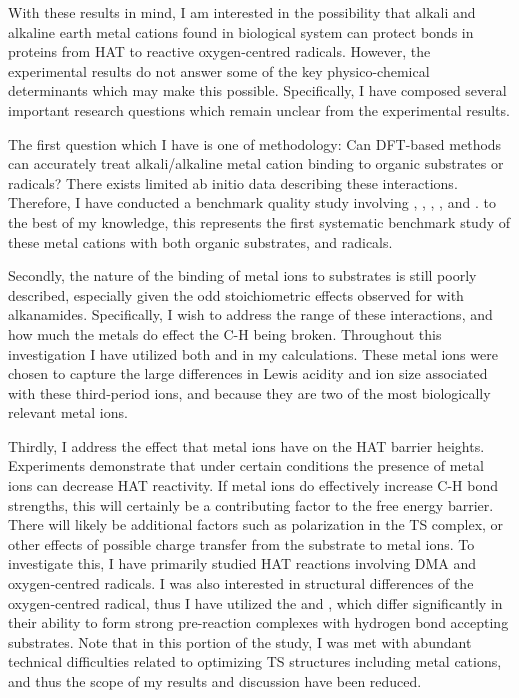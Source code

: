 With these results in mind, I am interested in the possibility that alkali and alkaline earth metal cations found in biological system can protect  bonds in proteins from HAT to reactive oxygen-centred radicals. However, the experimental results do not answer some of the key physico-chemical determinants which may make this possible. Specifically, I have composed several important research questions which remain unclear from the experimental results.

The first question which I have is one of methodology: Can DFT-based methods can accurately treat alkali/alkaline metal cation binding to organic substrates or radicals? There exists limited ab initio data describing these interactions.\cite{ Siu2001, Corral2003, Suarez2011, Baldauf2013} Therefore, I have conducted a benchmark quality study involving , , , , and . to the best of my knowledge, this represents the first systematic benchmark study of these metal cations with both organic substrates, and radicals.

Secondly, the nature of the binding of metal ions to substrates is still poorly described, especially given the odd stoichiometric effects observed for  with alkanamides. Specifically, I wish to address the range of these interactions, and how much the metals do effect the C-H being broken. Throughout this investigation I have utilized both  and  in my calculations. These metal ions were chosen to capture the large differences in Lewis acidity and ion size associated with these third-period ions, and because they are two of the most biologically relevant metal ions.

Thirdly, I address the effect that metal ions have on the HAT barrier heights.
Experiments demonstrate that under certain conditions the presence of metal ions can decrease HAT reactivity. If metal ions do effectively increase C-H bond strengths, this will certainly be a contributing factor to the free energy barrier. There will likely be additional factors such as polarization in the TS complex, or other effects of possible charge transfer from the substrate to metal ions. To investigate this, I have primarily studied HAT reactions involving DMA and oxygen-centred radicals. I was also interested in structural differences of the oxygen-centred radical, thus I have utilized the \bno and \cumo, which differ significantly in their ability to form strong pre-reaction complexes with hydrogen bond accepting substrates. Note that in this portion of the study, I was met with abundant technical difficulties related to optimizing TS structures including metal cations, and thus the scope of my results and discussion have been reduced.



